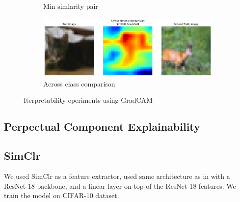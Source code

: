 \begin{figure}[h]
\begin{subfigure}{\linewidth}
        \caption{Min simlarity pair }
        \label{fig:gc4}
    \end{subfigure}\vspace{10pt}
    \begin{subfigure}{\linewidth}
        \includegraphics[width=\linewidth]{images/gc5.jpeg}
        \caption{Across class comparison}
        \label{fig:gc5}
    \end{subfigure}
    \caption{Iterpretability eperiments using GradCAM}
    \label{fig:gc_plots}
\end{figure}

\subsection{Perpectual Component Explainability}


\subsection{SimClr}
We used SimClr as a feature extractor, used same architecture as in \cite{chen2020simple} with a ResNet-18 backbone, and a linear layer on top of the ResNet-18 features. We train the model on CIFAR-10 dataset.

